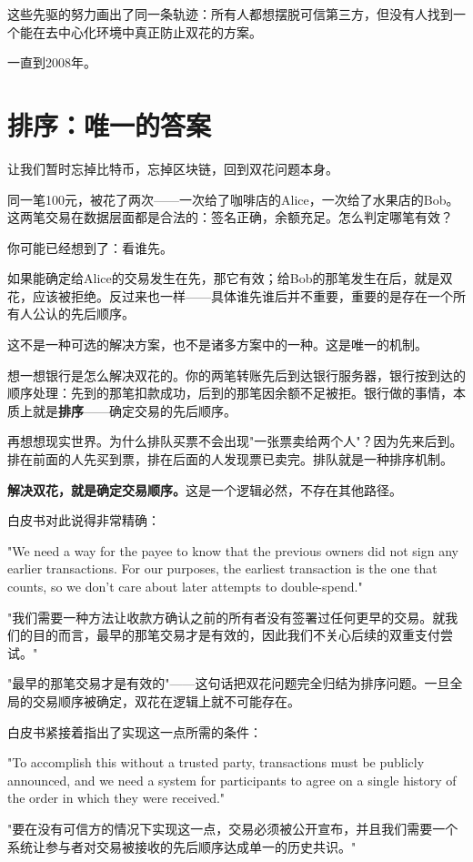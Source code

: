 \documentclass[a4paper,12pt,openany]{ctexbook}
\newenvironment{quoting}{%
  \par\vspace{0.5em}%
  \begin{list}{}{%
    \setlength{\leftmargin}{2em}%
    \setlength{\rightmargin}{2em}%
    \setlength{\parsep}{0.3em}%
    \setlength{\itemsep}{0pt}%
    \setlength{\topsep}{0pt}%
  }%
  \item\relax
}{%
  \end{list}%
  \par\vspace{0.5em}%
}
\begin{document}
这些先驱的努力画出了同一条轨迹：所有人都想摆脱可信第三方，但没有人找到一个能在去中心化环境中真正防止双花的方案。

一直到2008年。


\section*{排序：唯一的答案}


让我们暂时忘掉比特币，忘掉区块链，回到双花问题本身。

同一笔100元，被花了两次——一次给了咖啡店的Alice，一次给了水果店的Bob。这两笔交易在数据层面都是合法的：签名正确，余额充足。怎么判定哪笔有效？

你可能已经想到了：看谁先。

如果能确定给Alice的交易发生在先，那它有效；给Bob的那笔发生在后，就是双花，应该被拒绝。反过来也一样——具体谁先谁后并不重要，重要的是存在一个所有人公认的先后顺序。

这不是一种可选的解决方案，也不是诸多方案中的一种。这是唯一的机制。

想一想银行是怎么解决双花的。你的两笔转账先后到达银行服务器，银行按到达的顺序处理：先到的那笔扣款成功，后到的那笔因余额不足被拒。银行做的事情，本质上就是\textbf{排序}——确定交易的先后顺序。

再想想现实世界。为什么排队买票不会出现"一张票卖给两个人"？因为先来后到。排在前面的人先买到票，排在后面的人发现票已卖完。排队就是一种排序机制。

\textbf{解决双花，就是确定交易顺序。}这是一个逻辑必然，不存在其他路径。

白皮书对此说得非常精确：


\begin{quoting}
\small
"We need a way for the payee to know that the previous owners did not sign any earlier transactions. For our purposes, the earliest transaction is the one that counts, so we don't care about later attempts to double-spend."

"我们需要一种方法让收款方确认之前的所有者没有签署过任何更早的交易。就我们的目的而言，最早的那笔交易才是有效的，因此我们不关心后续的双重支付尝试。"
\end{quoting}


"最早的那笔交易才是有效的"——这句话把双花问题完全归结为排序问题。一旦全局的交易顺序被确定，双花在逻辑上就不可能存在。

白皮书紧接着指出了实现这一点所需的条件：


\begin{quoting}
\small
"To accomplish this without a trusted party, transactions must be publicly announced, and we need a system for participants to agree on a single history of the order in which they were received."

"要在没有可信方的情况下实现这一点，交易必须被公开宣布，并且我们需要一个系统让参与者对交易被接收的先后顺序达成单一的历史共识。"
\end{quoting}
\end{document}
